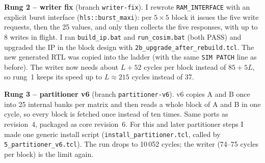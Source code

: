 \documentclass[11pt,a4paper]{article}
\newcommand{\code}[1]{\texttt{#1}}
\begin{document}
\textbf{Rung 2 -- writer fix} (branch \code{writer-fix}). I rewrote \code{RAM\_INTERFACE} with an explicit burst interface (\code{hls::burst\_maxi}): per $5\times5$ block it issues the five write requests, then the 25 values, and only then collects the five responses, with up to 8 writes in flight. I ran \code{build\_ip.bat} and \code{run\_cosim.bat} (both PASS) and upgraded the IP in the block design with \code{2b\_upgrade\_after\_rebuild.tcl}. The new generated RTL was copied into the ladder (with the same \code{SIM PATCH} line as before). The writer now needs about $L + 52$ cycles per block instead of $85 + 5L$, so rung~1 keeps its speed up to $L \approx 215$ cycles instead of 37.

\textbf{Rung 3 -- partitioner v6} (branch \code{partitioner-v6}). v6 copies A and B once into 25 internal banks per matrix and then reads a whole block of A and B in one cycle, so every block is fetched once instead of ten times. Same ports as revision~4, packaged as core revision~6. For this and later partitioner steps I made one generic install script (\code{install\_partitioner.tcl}, called by \code{5\_partitioner\_v6.tcl}). The run drops to 10\,052 cycles; the writer (74--75 cycles per block) is the limit again.
\end{document}
